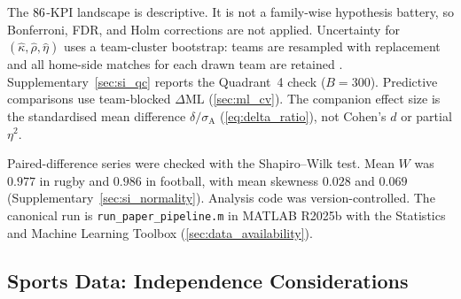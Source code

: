 The $86{}$-KPI landscape is descriptive. It is not a family-wise hypothesis battery, so Bonferroni, FDR, and Holm corrections are not applied. Uncertainty for $(\hat\kappa,\hat\rho,\hat\eta)$ uses a team-cluster bootstrap: teams are resampled with replacement and all home-side matches for each drawn team are retained \parencite{efron1979}. Supplementary~\cref{sec:si_qc} reports the Quadrant~4 check ($B=300$). Predictive comparisons use team-blocked $\Delta\mathrm{ML}$ (\cref{sec:ml_cv}). The companion effect size is the standardised mean difference $\delta/\sigma_{\mathrm{A}}$ (\cref{eq:delta_ratio}), not Cohen's $d$ or partial $\eta^{2}$.

Paired-difference series were checked with the Shapiro--Wilk test. Mean $W$ was $0.977$ in rugby and $0.986$ in football, with mean skewness $0.028$ and $0.069$ (Supplementary~\cref{sec:si_normality}). Analysis code was version-controlled. The canonical run is \texttt{run\_paper\_pipeline.m} in {MATLAB} {R2025b} with the Statistics and Machine Learning Toolbox (\cref{sec:data_availability}).

\subsection{Sports Data: Independence Considerations}

